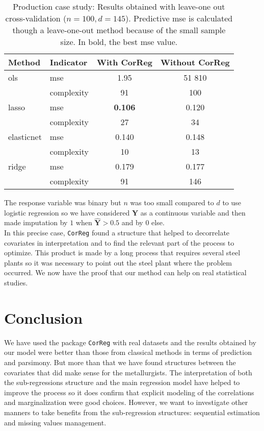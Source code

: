 \documentclass[12pt,a4paper]{report}
\begin{document}
\begin{table}[h!]
\centering
\begin{tabular}{llcc}
	\hline 
	Method& Indicator& With {\sc CorReg} & Without {\sc CorReg} \\ 
	\hline\hline
	{\sc ols} &  {\sc mse}& 1.95& 51 810\\
		& complexity & 91& 100 \\
	\hline 
		{\sc lasso} & {\sc mse} & {\bf 0.106} & 0.120\\
		& complexity & 27&34\\
	\hline 
		elasticnet & {\sc mse} &0.140 &0.148\\
		& complexity &10 &13\\
	\hline 
		ridge & {\sc mse} & 0.179 & 0.177\\
		& complexity &91 &146\\
	\hline 
\end{tabular} 
\caption{Production case study: Results obtained with leave-one out cross-validation ($n=100, d=145$). Predictive {\sc mse} is calculated though a leave-one-out method because of the small sample size. In bold, the best {\sc mse} value.}	\label{Res_prod}
\end{table}
The response variable was binary but $n$ was too small compared to $d$ to use logistic regression so we have considered $\boldsymbol{Y}$ as a continuous variable and then made imputation by $1$ when $\hat{\boldsymbol{Y}}>0.5$ and by $0$ else.\\

In this precise case, {\tt CorReg} found a structure that helped to decorrelate covariates in interpretation and to find the relevant part of the process to optimize. This product is made by a long process that requires several steel plants so it was necessary to point out the steel plant where the problem occurred. We now have the proof that our method can help on real statistical studies.

\section{Conclusion}
We have used the package {\tt CorReg} with real datasets and the results obtained by our model were better than those from classical methods in terms of prediction and parsimony. But more than that we have found structures between the covariates that did make sense for the metallurgists. The interpretation of both the sub-regressions structure and the main regression model have helped to improve the process so it does confirm that explicit modeling of the correlations and marginalization were good choices. However, we want to investigate other manners to take benefits from the sub-regression structures: sequential estimation and missing values management.
\end{document}
